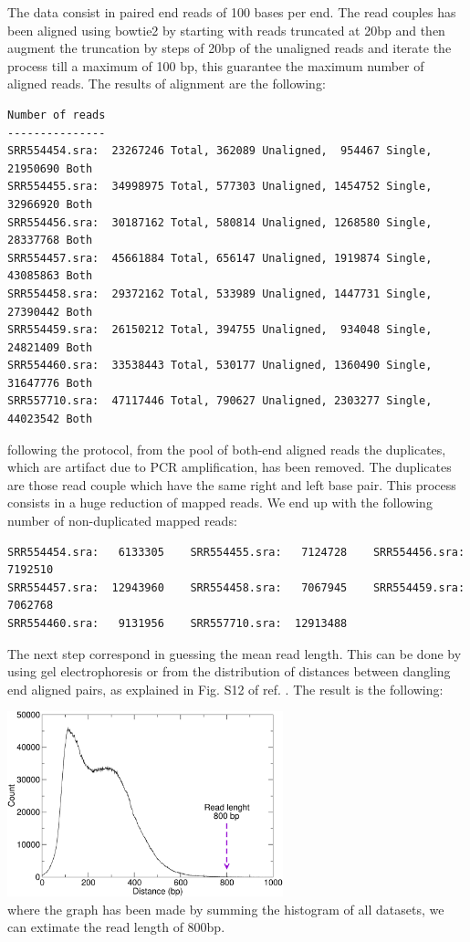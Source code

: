 \documentclass[12pt,a4paper,notitlepage]{article}
\begin{document}
The data consist in paired end reads of 100 bases per end. The read
couples has been aligned using bowtie2 by starting with reads
truncated at 20bp and then augment the truncation by steps of 20bp of
the unaligned reads and iterate the process till a maximum of 100 bp,
this guarantee the maximum number of aligned reads. The results of
alignment are the following:
\begin{verbatim}
Number of reads
---------------
SRR554454.sra:  23267246 Total, 362089 Unaligned,  954467 Single, 21950690 Both
SRR554455.sra:  34998975 Total, 577303 Unaligned, 1454752 Single, 32966920 Both
SRR554456.sra:  30187162 Total, 580814 Unaligned, 1268580 Single, 28337768 Both
SRR554457.sra:  45661884 Total, 656147 Unaligned, 1919874 Single, 43085863 Both
SRR554458.sra:  29372162 Total, 533989 Unaligned, 1447731 Single, 27390442 Both
SRR554459.sra:  26150212 Total, 394755 Unaligned,  934048 Single, 24821409 Both
SRR554460.sra:  33538443 Total, 530177 Unaligned, 1360490 Single, 31647776 Both
SRR557710.sra:  47117446 Total, 790627 Unaligned, 2303277 Single, 44023542 Both
\end{verbatim}
following the protocol, from the pool of both-end aligned reads the
duplicates, which are artifact due to PCR amplification, has been
removed. The duplicates are those read couple which have the same
right and left base pair. This process consists in a huge reduction of
mapped reads. We end up with the following number of non-duplicated
mapped reads:
\begin{verbatim}
SRR554454.sra:   6133305    SRR554455.sra:   7124728    SRR554456.sra:   7192510
SRR554457.sra:  12943960    SRR554458.sra:   7067945    SRR554459.sra:   7062768
SRR554460.sra:   9131956    SRR557710.sra:  12913488
\end{verbatim}

The next step correspond in guessing the mean read length. This can be
done by using gel electrophoresis or from the distribution of
distances between dangling end aligned pairs, as explained in Fig. S12
of ref. \cite{Imakaev2012}. The result is the following:

\vspace{.5cm}\hspace{4cm}\includegraphics[width=8cm]{dangling}\\
where the graph has been made by summing the histogram of all
datasets, we can extimate the read length of 800bp.
\end{document}
